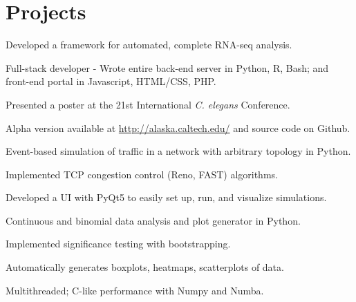 \documentclass[]{resume}
\begin{document}
\begin{minipage}[t]{0.66\textwidth}


\section{Projects}
\vspace{\topsep} %
\begin{tightemize}
\item Developed a framework for automated, complete RNA-seq analysis.
\item Full-stack developer - Wrote entire back-end server in Python, R, Bash; and front-end portal in Javascript, HTML/CSS, PHP.
\item Presented a poster at the 21st International \textit{C. elegans} Conference.
\item Alpha version available at \textcolor{blue}{ \href{http://alaska.caltech.edu/}{http://alaska.caltech.edu/}} and source code on Github.
\end{tightemize}
\sectionsep

\begin{tightemize}
\item Event-based simulation of traffic in a network with arbitrary topology in Python.
\item Implemented TCP congestion control (Reno, FAST) algorithms.
\item Developed a UI with PyQt5 to easily set up, run, and visualize simulations.
\end{tightemize}
\sectionsep

\begin{tightemize}
\item Continuous and binomial data analysis and plot generator in Python.
\item Implemented significance testing with bootstrapping.
\item Automatically generates boxplots, heatmaps, scatterplots of data.
\item Multithreaded; C-like performance with Numpy and Numba.
\end{tightemize}
\sectionsep


\end{minipage}
\end{document}
